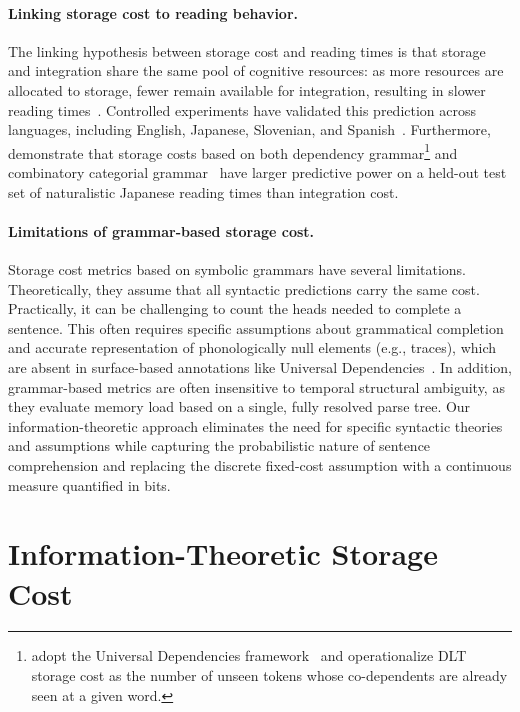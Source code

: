 \documentclass[11pt]{article}
\begin{document}
\paragraph{Linking storage cost to reading behavior.}
The linking hypothesis between storage cost and reading times is that storage and integration share the same pool of cognitive resources: as more resources are allocated to storage, fewer remain available for integration, resulting in slower reading times~\citep{gibson-1998,gibson-2000}.
Controlled experiments have validated this prediction across languages, including English, Japanese, Slovenian, and Spanish~\citep{chen-etal-2005,nakatani-gibson-2010,stepanov-stateva-2015,ristic-etal-2022}.
Furthermore, \citet{isono-etal-ur} demonstrate that storage costs based on both dependency grammar\footnote{\citet{isono-etal-ur} adopt the Universal Dependencies framework~\citep{de-marneffe-etal-2021} and operationalize DLT storage cost as the number of unseen tokens whose co-dependents are already seen at a given word.} and combinatory categorial grammar~\citep[CCG;][]{steedman-2000} have larger predictive power on a held-out test set of naturalistic Japanese reading times than integration cost.

\paragraph{Limitations of grammar-based storage cost.}
Storage cost metrics based on symbolic grammars have several limitations.
Theoretically, they assume that all syntactic predictions carry the same cost.
Practically, it can be challenging to count the heads needed to complete a sentence.
This often requires specific assumptions about grammatical completion and accurate representation of phonologically null elements (e.g., traces), which are absent in surface-based annotations like Universal Dependencies~\citep{de-marneffe-etal-2021}.
In addition, grammar-based metrics are often insensitive to temporal structural ambiguity, as they evaluate memory load based on a single, fully resolved parse tree.
Our information-theoretic approach eliminates the need for specific syntactic theories and assumptions while capturing the probabilistic nature of sentence comprehension and replacing the discrete fixed-cost assumption with a continuous measure quantified in bits.






\section{Information-Theoretic Storage Cost}
\label{sec:proposal}
\end{document}
